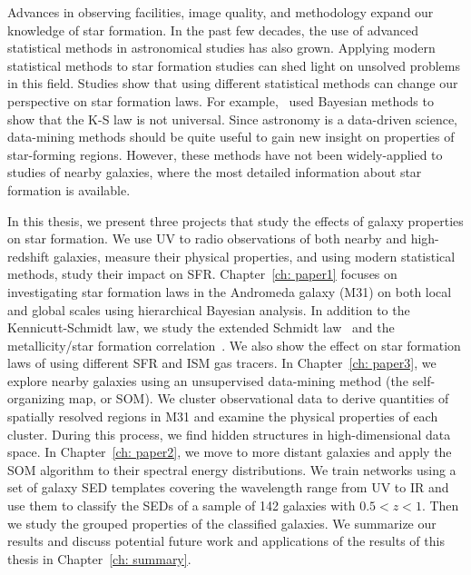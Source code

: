 Advances in observing facilities, image quality, and methodology expand our knowledge of star formation. 
In the past few decades, the use of advanced statistical methods in astronomical studies has also grown.
Applying modern statistical methods to star formation studies can shed light on unsolved problems in this field. 
Studies show that using different statistical methods can change our perspective on star formation laws. 
For example,~\cite{Shetty13} used Bayesian methods to show that the K-S law is not universal. 
Since astronomy is a data-driven science, data-mining methods should be quite useful to gain new insight on properties of star-forming regions. However, these methods have not been widely-applied to studies of nearby galaxies, where the most detailed information about star formation is available.


In this thesis, we present three projects that study the effects of galaxy properties on star formation.
We use UV to radio observations of both nearby and high-redshift galaxies, measure their physical properties, and using modern statistical methods, study their impact on SFR.
Chapter~\ref{ch: paper1} focuses on investigating star formation laws in the Andromeda galaxy (M31) on both local and global scales using hierarchical Bayesian analysis.
In addition to the Kennicutt-Schmidt law, we study the extended Schmidt law~\citep{Shi11} and the metallicity/star formation correlation~\citep{Krumholz09}.
We also show the effect on star formation laws of using different SFR and ISM gas tracers.
In Chapter~\ref{ch: paper3}, we explore nearby galaxies using an unsupervised data-mining method (the self-organizing map, or SOM).
We cluster observational data to derive quantities of spatially resolved regions in M31 and examine the physical properties of each cluster.
During this process, we find hidden structures in high-dimensional data space.
In Chapter~\ref{ch: paper2}, we move to more distant galaxies and apply the SOM algorithm to their spectral energy distributions.
We train networks using a set of galaxy SED templates covering the wavelength range from UV to IR and use them to classify the SEDs of a sample of 142 galaxies with $0.5 < z < 1$. 
Then we study the grouped properties of the classified galaxies.
We summarize our results and discuss potential future work and applications of the results of this thesis in Chapter~\ref{ch: summary}.

